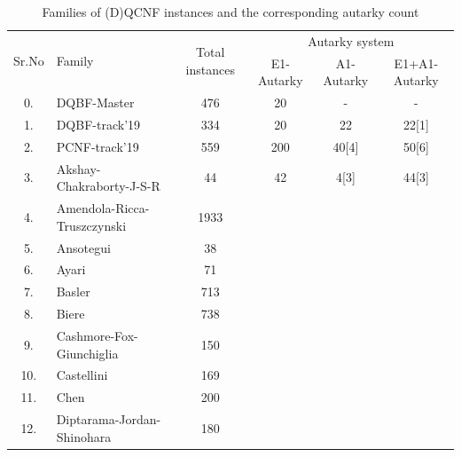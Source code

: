 \documentclass[runningheads]{llncs}
\begin{document}
\begin{table}
\caption{Families of (D)QCNF instances and the corresponding autarky count}\label{tab:aut-count}
\begin{tabular}{c|l|c|c|c|c}

\hline
   \multirow{2}{1cm}{Sr.No} &  \multirow{2}{3cm}{Family} &  \multirow{2}{2cm}{Total instances} & \multicolumn{3}{c}{Autarky system} \\
    \cline{4-6}
  & & & E1-Autarky & A1-Autarky & E1+A1-Autarky \\

\hline

0. & DQBF-Master &  476 & 20 & - & - \\ \hline
1. & DQBF-track'19 &  334 & 20 & 22 & 22[1] \\ \hline
2. & PCNF-track'19 &  559 & 200 & 40[4] & 50[6] \\ \hline
3. & Akshay-Chakraborty-J-S-R &  44 & 42 & 4[3] & 44[3] \\ \hline
4. & Amendola-Ricca-Truszczynski & 1933 & &  &  \\ \hline

5. & Ansotegui &  38 & &  &  \\ \hline

6. & Ayari &  71 &  &  &  \\ \hline

7. & Basler &  713 & & &  \\ \hline

8. & Biere &  738 & &  &  \\ \hline

9. & Cashmore-Fox-Giunchiglia &  150 &  &  &  \\ \hline

10. & Castellini &  169 & &  &  \\ \hline

11. & Chen &  200 &  &  &  \\ \hline

12. & Diptarama-Jordan-Shinohara &  180 &  &  &  \\ \hline


\end{tabular}
\end{table}
\end{document}
